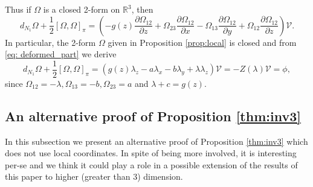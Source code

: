 \documentclass[12pt]{article}
\begin{document}
Thus if $\Omega$ is a closed 2-form on $\mathbb{R}^3$, then 
\begin{equation}\label{eq: deformed_part}
d_{N_1}\Omega+\frac{1}{2}\left[\Omega,\Omega\right]_{\pi}=\left(-g(z)\frac{\partial \Omega_{12}}{\partial z}+\Omega_{23}\frac{\partial\Omega_{12}}{\partial x}-\Omega_{13}\frac{\partial\Omega_{12}}{\partial y}+\Omega_{12}\frac{\partial\Omega_{12}}{\partial z}\right)\mathcal V.
\end{equation}
In particular, the 2-form $\Omega$ given in %
Proposition \ref{prop:local} is closed and from \eqref{eq: deformed_part} we derive 
\[
d_{N_1}\Omega+\frac{1}{2}\left[\Omega,\Omega\right]_{\pi}=(g(z)\lambda_z-a\lambda_x-b\lambda_y+\lambda\lambda_z)\mathcal V=-Z(\lambda)\mathcal V=\phi,
\]
since $\Omega_{12}=-\lambda,\Omega_{13}=-b,\Omega_{23}=a$ and $\lambda+c=g(z)$.



\subsection{An alternative proof of Proposition \ref{thm:inv3}}\label{ss:proofth} In this subsection we present an alternative proof of Proposition \ref{thm:inv3} which does not use local coordinates. In spite of being more involved, it is interesting per-se and we think it could play a role in a possible extension of the results of this paper to higher (greater than 3) dimension.
\end{document}
